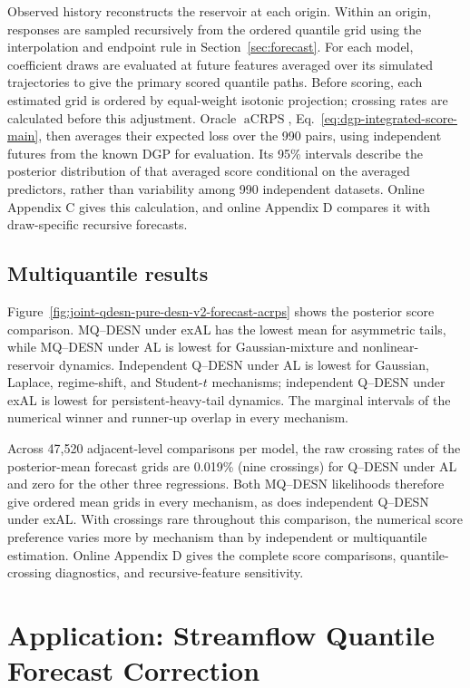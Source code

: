 \documentclass[12pt,letterpaper]{article}
\numberwithin{equation}{section}
\newcommand{\aCRPS}{\operatorname{aCRPS}}
\begin{document}
Observed history reconstructs the reservoir at each origin. Within an origin,
responses are sampled recursively from the ordered quantile grid using the
interpolation and endpoint rule in Section~\ref{sec:forecast}. For each
model, coefficient draws are evaluated at future features averaged over its
simulated trajectories to give the primary scored quantile paths. Before
scoring, each estimated grid is ordered by equal-weight isotonic projection;
crossing rates are calculated before this adjustment. Oracle \(\aCRPS\),
Eq.~\eqref{eq:dgp-integrated-score-main},
then averages their expected loss over the 990 pairs, using independent
futures from the known DGP for evaluation. Its 95\% intervals describe the
posterior distribution of that averaged score conditional on the averaged
predictors, rather than variability among 990 independent datasets.
Online Appendix C gives this calculation, and online Appendix D compares
it with draw-specific recursive forecasts.

\subsection{Multiquantile results}
\label{subsec:simulation-mq-results}

Figure~\ref{fig:joint-qdesn-pure-desn-v2-forecast-acrps} shows the posterior
score comparison. MQ--DESN under exAL has the lowest mean for asymmetric
tails, while MQ--DESN under AL is lowest for Gaussian-mixture and
nonlinear-reservoir dynamics. Independent Q--DESN under AL is lowest for
Gaussian, Laplace, regime-shift, and Student-\(t\) mechanisms; independent
Q--DESN under exAL is lowest for persistent-heavy-tail dynamics.
The marginal intervals of the numerical winner and runner-up overlap in
every mechanism.

Across 47,520 adjacent-level comparisons per model, the raw crossing rates of
the posterior-mean forecast grids are 0.019\% (nine crossings) for Q--DESN
under AL and zero for the other three regressions. Both MQ--DESN
likelihoods therefore give ordered mean grids in every mechanism, as does
independent Q--DESN under exAL. With crossings rare throughout this
comparison, the numerical score preference varies more by mechanism than
by independent or multiquantile estimation. Online Appendix D gives the complete
score comparisons, quantile-crossing diagnostics, and recursive-feature
sensitivity.


\clearpage

\section{Application: Streamflow Quantile Forecast Correction}
\label{sec:data}
\end{document}

